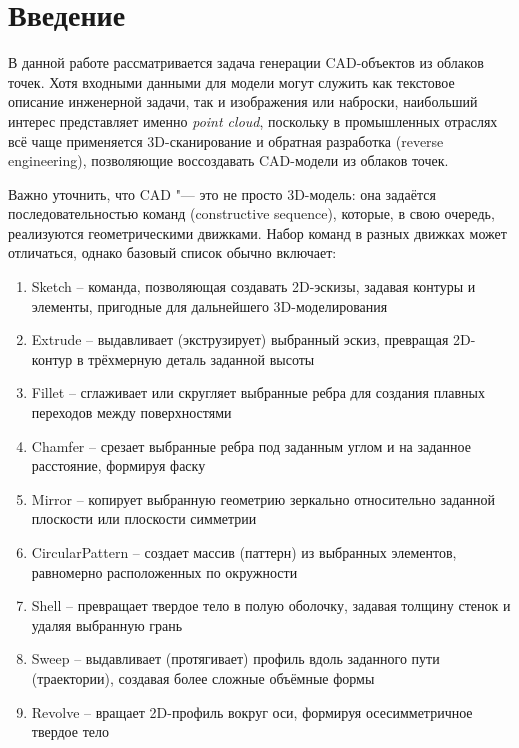 \section{Введение}
\label{sec:Chapter0} 

В данной работе рассматривается задача генерации CAD-объектов из облаков точек. Хотя входными данными для модели могут служить как текстовое описание инженерной задачи, так и изображения или наброски, наибольший интерес представляет именно \textit{point cloud}, поскольку в промышленных отраслях всё чаще применяется 3D-сканирование и обратная разработка (reverse engineering), позволяющие воссоздавать CAD-модели из облаков точек.

Важно уточнить, что CAD "--- это не просто 3D-модель: она задаётся последовательностью команд (constructive sequence), которые, в свою очередь, реализуются геометрическими движками. Набор команд в разных движках может отличаться, однако базовый список обычно включает:
\begin{enumerate}
	\item Sketch -- команда, позволяющая создавать 2D-эскизы, задавая контуры и элементы,
	      пригодные для дальнейшего 3D-моделирования
	\item Extrude -- выдавливает (экструзирует) выбранный эскиз, превращая 2D-контур в
	      трёхмерную деталь заданной высоты
	\item Fillet -- сглаживает или скругляет выбранные ребра для создания плавных
	      переходов между поверхностями
	\item Chamfer -- срезает выбранные ребра под заданным углом и на заданное расстояние,
	      формируя фаску
	\item Mirror -- копирует выбранную геометрию зеркально относительно заданной
	      плоскости или плоскости симметрии
	\item CircularPattern -- создает массив (паттерн) из выбранных элементов, равномерно
	      расположенных по окружности
	\item Shell -- превращает твердое тело в полую оболочку, задавая толщину стенок и
	      удаляя выбранную грань
	\item Sweep -- выдавливает (протягивает) профиль вдоль заданного пути (траектории),
	      создавая более сложные объёмные формы
	\item Revolve -- вращает 2D-профиль вокруг оси, формируя осесимметричное твердое тело
\end{enumerate}


